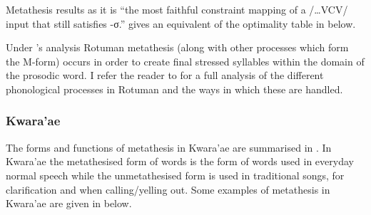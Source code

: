 Metathesis results as it is ``the most faithful constraint mapping of a
/{\ldots}VCV/ input that still satisfies -σ.''
\citet[174]{mcc00} gives an equivalent of the optimality table in  below.

\newpage
\begin{exe}
\label{ex:RotOT}
\end{exe}

Under \citeauthor{mcc00}'s analysis Rotuman metathesis
(along with other processes which form the M-form)
occurs in order to create final stressed syllables
within the domain of the prosodic word.
I refer the reader to \cite{mcc00} for a full analysis
of the different phonological processes in Rotuman
and the ways in which these are handled.

\subsubsection{Kwara'ae}\label{sec:ProMorKwa}
The forms and functions of metathesis in Kwara'ae are summarised in .
In Kwara'ae the metathesised form of words is the form of words used in everyday normal speech
while the unmetathesised form is used in traditional songs,
for clarification and when calling/yelling out.
Some examples of metathesis in Kwara'ae
are given in  below.

\begin{exe}
	\label{ex2:KwVCV->VVC}
\end{exe}

